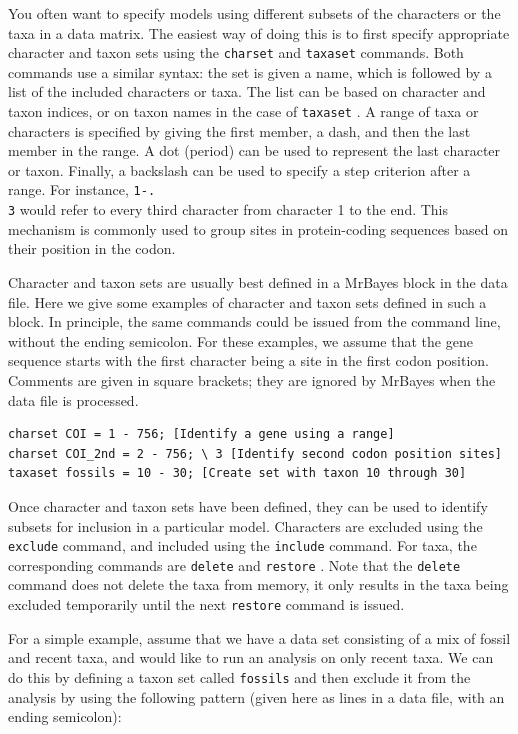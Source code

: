 \documentclass[12pt]{book}
\newcommand{\ttt}[1]{\texttt{#1} }
\begin{document}
You often want to specify models using different subsets of the characters or the taxa in a data matrix. The
easiest way of doing this is to first specify appropriate character and taxon sets using the \ttt{charset} and
\ttt{taxaset} commands. Both commands use a similar syntax: the set is given a name, which is followed by
a list of the included characters or taxa. The list can be based on character and taxon indices, or on taxon
names in the case of \ttt{taxaset}. A range of taxa or characters is specified by giving the first member, a dash,
and then the last member in the range. A dot (period) can be used to represent the last character or taxon.
Finally, a backslash can be used to specify a step criterion after a range. For instance, \ttt{1-.\\3} would refer
to every third character from character 1 to the end. This mechanism is commonly used to group sites in
protein-coding sequences based on their position in the codon.

Character and taxon sets are usually best defined in a MrBayes block in the data file. Here we give some examples
of character and taxon sets defined in such a block. In principle, the same commands could be issued from the
command line, without the ending semicolon. For these examples, we assume that the gene sequence starts with
the first character being a site in the first codon position. Comments are given in square brackets; they are ignored
by MrBayes when the data file is processed.

\footnotesize
\begin{singlespacing}
\begin{verbatim}
charset COI = 1 - 756; [Identify a gene using a range]
charset COI_2nd = 2 - 756; \ 3 [Identify second codon position sites]
taxaset fossils = 10 - 30; [Create set with taxon 10 through 30] 
\end{verbatim}
\end{singlespacing}
\normalsize

Once character and taxon sets have been defined, they can be used to identify subsets for inclusion in
a particular model. Characters are excluded using the \ttt{exclude} command, and included using the
\ttt{include} command. For taxa, the corresponding commands are \ttt{delete} and \ttt{restore}. Note that
the \ttt{delete} command does not delete the taxa from memory, it only results in the taxa being excluded
temporarily until the next \ttt{restore} command is issued.

For a simple example, assume that we have a data set consisting of a mix of fossil and recent taxa, and
would like to run an analysis on only recent taxa. We can do this by defining a taxon set called \ttt{fossils}
and then exclude it from the analysis by using the following pattern (given here as lines in a data file, with
an ending semicolon):
\end{document}
